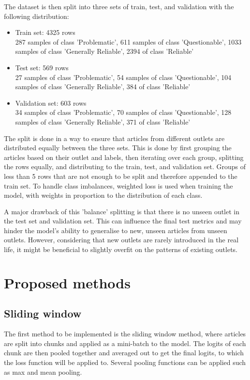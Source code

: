 The dataset is then split into three sets of train, test, and validation with the following distribution:
\begin{itemize}
    \item Train set: 4325 rows \\
          287 samples of class 'Problematic', 611 samples of class 'Questionable', 1033 samples of class 'Generally Reliable', 2394 of class 'Reliable'
    \item Test set: 569 rows \\
          27 samples of class 'Problematic', 54 samples of class 'Questionable', 104 samples of class 'Generally Reliable', 384 of class 'Reliable'
    \item Validation set: 603 rows \\
          34 samples of class 'Problematic', 70 samples of class 'Questionable', 128 samples of class 'Generally Reliable', 371 of class 'Reliable'
\end{itemize}

The split is done in a way to ensure that articles from different outlets are distributed equally between the three sets. This is done by first grouping the articles based on their outlet and labels, then iterating over each group, splitting the rows equally, and distributing to the train, test, and validation set. Groups of less than 5 rows that are not enough to be split and therefore appended to the train set. To handle class imbalances, weighted loss is used when training the model, with weights in proportion to the distribution of each class.

A major drawback of this 'balance' splitting is that there is no unseen outlet in the test set and validation set. This can influence the final test metrics and may hinder the model's ability to generalise to new, unseen articles from unseen outlets. However, considering that new outlets are rarely introduced in the real life, it might be beneficial to slightly overfit on the patterns of existing outlets.

\section{Proposed methods}

\subsection{Sliding window}

The first method to be implemented is the sliding window method, where articles are split into chunks and applied as a mini-batch to the model. The logits of each chunk are then pooled together and averaged out to get the final logits, to which the loss function will be applied to. Several pooling functions can be applied such as max and mean pooling.

